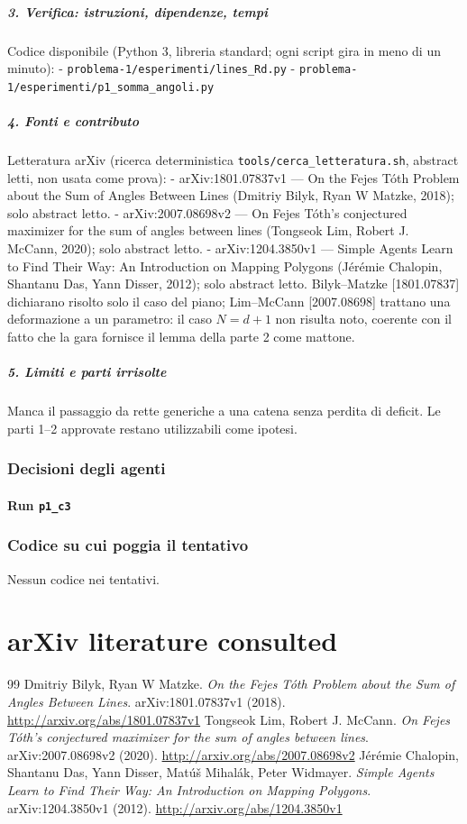 \documentclass[11pt,a4paper]{article}
\begin{document}
\subparagraph{3. Verifica: istruzioni, dipendenze,
tempi}\label{verifica-istruzioni-dipendenze-tempi}

Codice disponibile (Python 3, libreria standard; ogni script gira in
meno di un minuto): - \texttt{problema-1/esperimenti/lines\_Rd.py} -
\texttt{problema-1/esperimenti/p1\_somma\_angoli.py}

\subparagraph{4. Fonti e contributo}\label{fonti-e-contributo}

Letteratura arXiv (ricerca deterministica
\texttt{tools/cerca\_letteratura.sh}, abstract letti, non usata come
prova): - arXiv:1801.07837v1 --- On the Fejes Tóth Problem about the Sum
of Angles Between Lines (Dmitriy Bilyk, Ryan W Matzke, 2018); solo
abstract letto. - arXiv:2007.08698v2 --- On Fejes Tóth's conjectured
maximizer for the sum of angles between lines (Tongseok Lim, Robert J.
McCann, 2020); solo abstract letto. - arXiv:1204.3850v1 --- Simple
Agents Learn to Find Their Way: An Introduction on Mapping Polygons
(Jérémie Chalopin, Shantanu Das, Yann Disser, 2012); solo abstract
letto. Bilyk--Matzke {[}1801.07837{]} dichiarano risolto solo il caso
del piano; Lim--McCann {[}2007.08698{]} trattano una deformazione a un
parametro: il caso \(N=d+1\) non risulta noto, coerente con il fatto che
la gara fornisce il lemma della parte 2 come mattone.

\subparagraph{5. Limiti e parti
irrisolte}\label{limiti-e-parti-irrisolte}

Manca il passaggio da rette generiche a una catena senza perdita di
deficit. Le parti 1--2 approvate restano utilizzabili come ipotesi.

\subsubsection{Decisioni degli agenti}
\paragraph{Run \texttt{p1\_c3}}

\subsubsection{Codice su cui poggia il tentativo}
Nessun codice nei tentativi.

\section{arXiv literature consulted}
\begin{thebibliography}{99}
 Dmitriy Bilyk, Ryan W Matzke. \emph{On the Fejes Tóth Problem about the Sum of Angles Between Lines}. arXiv:1801.07837v1 (2018). \url{http://arxiv.org/abs/1801.07837v1}
 Tongseok Lim, Robert J. McCann. \emph{On Fejes Tóth's conjectured maximizer for the sum of angles between lines}. arXiv:2007.08698v2 (2020). \url{http://arxiv.org/abs/2007.08698v2}
 Jérémie Chalopin, Shantanu Das, Yann Disser, Matúš Mihalák, Peter Widmayer. \emph{Simple Agents Learn to Find Their Way: An Introduction on Mapping Polygons}. arXiv:1204.3850v1 (2012). \url{http://arxiv.org/abs/1204.3850v1}
\end{thebibliography}
\end{document}
